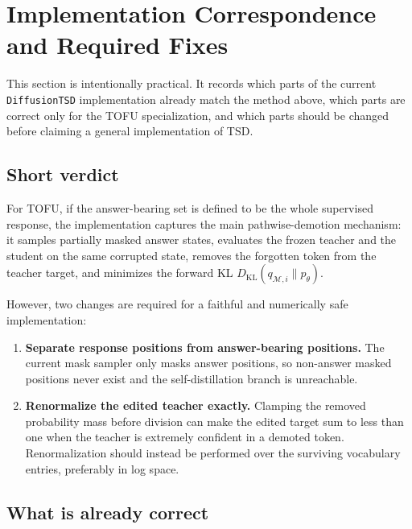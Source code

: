 \documentclass{article}
\newcommand{\Mset}{\mathcal{M}}
\newcommand{\KL}{D_{\mathrm{KL}}}
\begin{document}
\section{Implementation Correspondence and Required Fixes}
\label{sec:implementation-notes}

This section is intentionally practical.  It records which parts of the current
\texttt{DiffusionTSD} implementation already match the method above, which parts
are correct only for the TOFU specialization, and which parts should be changed
before claiming a general implementation of TSD.

\subsection{Short verdict}

For TOFU, if the answer-bearing set is defined to be the whole supervised
response, the implementation captures the main pathwise-demotion mechanism:
it samples partially masked answer states, evaluates the frozen teacher and the
student on the same corrupted state, removes the forgotten token from the
teacher target, and minimizes the forward KL
$\KL(q_{\Mset,i}\|p_\theta)$.

However, two changes are required for a faithful and numerically safe
implementation:
\begin{enumerate}[leftmargin=*]
    \item \textbf{Separate response positions from answer-bearing positions.}
    The current mask sampler only masks answer positions, so non-answer masked
    positions never exist and the self-distillation branch is unreachable.
    \item \textbf{Renormalize the edited teacher exactly.}
    Clamping the removed probability mass before division can make the edited
    target sum to less than one when the teacher is extremely confident in a
    demoted token.  Renormalization should instead be performed over the
    surviving vocabulary entries, preferably in log space.
\end{enumerate}

\subsection{What is already correct}
\end{document}
